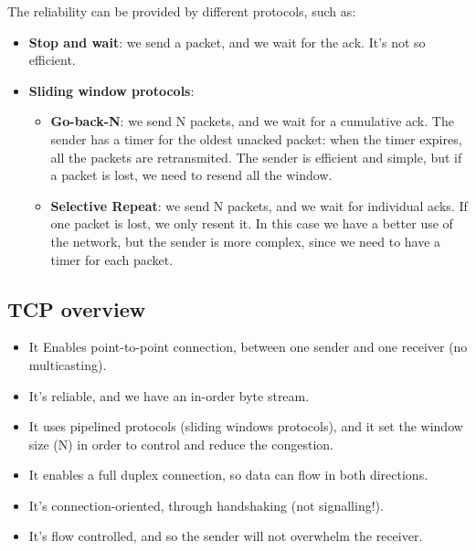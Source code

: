 The reliability can be provided by different protocols, such as:
\begin{itemize}
    \item \textbf{Stop and wait}: we send a packet, and we wait for the ack. It's not so efficient.
    \item \textbf{Sliding window protocols}:\begin{itemize}
        \item \textbf{Go-back-N}: we send N packets, and we wait for a cumulative ack. The sender has a timer for the oldest unacked packet: when the timer expires, all the packets are retransmited. The sender is efficient and simple, but if a packet is lost, we need to resend all the window.
        \item \textbf{Selective Repeat}: we send N packets, and we wait for individual acks. If one packet is lost, we only resent it. In this case we have a better use of the network, but the sender is more complex, since we need to have a timer for each packet.
    \end{itemize}
    
\end{itemize}

\subsection{TCP overview}
\begin{itemize}
    \item It Enables point-to-point connection, between one sender and one receiver (no multicasting).
    \item It's reliable, and we have an in-order byte stream.
    \item It uses pipelined protocols (sliding windows protocols), and it set the window size (N) in order to control and reduce the congestion.
    \item It enables a full duplex connection, so data can flow in both directions.
    \item It's connection-oriented, through handshaking (not signalling!).
    \item It's flow controlled, and so the sender will not overwhelm the receiver.
\end{itemize}

